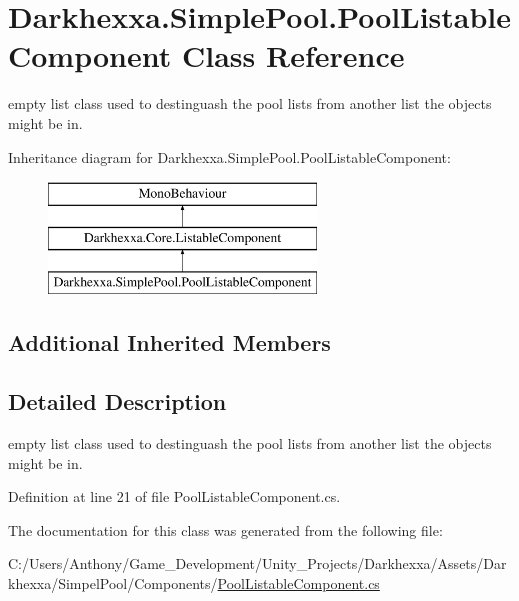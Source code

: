 \hypertarget{class_darkhexxa_1_1_simple_pool_1_1_pool_listable_component}{\section{Darkhexxa.\-Simple\-Pool.\-Pool\-Listable\-Component Class Reference}
\label{class_darkhexxa_1_1_simple_pool_1_1_pool_listable_component}
}


empty list class used to destinguash the pool lists from another list the objects might be in.  


Inheritance diagram for Darkhexxa.\-Simple\-Pool.\-Pool\-Listable\-Component\-:\begin{figure}[H]
\begin{center}
\leavevmode
\includegraphics[height=3.000000cm]{class_darkhexxa_1_1_simple_pool_1_1_pool_listable_component}
\end{center}
\end{figure}
\subsection*{Additional Inherited Members}


\subsection{Detailed Description}
empty list class used to destinguash the pool lists from another list the objects might be in. 

Definition at line 21 of file Pool\-Listable\-Component.\-cs.



The documentation for this class was generated from the following file\-:\begin{DoxyCompactItemize}
\item 
C\-:/\-Users/\-Anthony/\-Game\-\_\-\-Development/\-Unity\-\_\-\-Projects/\-Darkhexxa/\-Assets/\-Darkhexxa/\-Simpel\-Pool/\-Components/\hyperlink{_pool_listable_component_8cs}{Pool\-Listable\-Component.\-cs}\end{DoxyCompactItemize}
